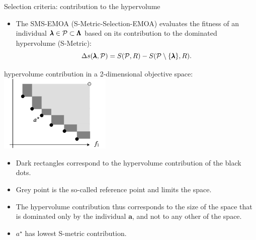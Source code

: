 \begin{frame}[allowframebreaks]{Selection criteria: contribution to the hypervolume}

\begin{itemize}
\item The SMS-EMOA (S-Metric-Selection-EMOA) evaluates the fitness of an individual $\pmb{\lambda} \in \mathcal{P} \subset \pmb{\Lambda}$ based on its contribution to the dominated hypervolume (S-Metric):
$$
\Delta s(\pmb{\lambda}, \mathcal{P}) = S(\mathcal{P}, R) - S(\mathcal{P} \setminus \{ \pmb{\lambda}\}, R).
$$
\end{itemize}



\framebreak

\begin{center}
hypervolume contribution in a 2-dimensional objective space:\\
\includegraphics[width = 0.4\textwidth]{images/hypervolumenbeitrag.png}
\end{center}

\footnotesize
\vspace*{-0.5cm}
\begin{itemize}
\item Dark rectangles correspond to the hypervolume contribution of the black dots.
\item Grey point is the so-called reference point and limits the space.
\item The hypervolume contribution thus corresponds to the size of the space that is dominated only by the individual $\bm{a}$, and not to any other of the space.
\item $a^\star$ has lowest S-metric contribution.
\end{itemize}
\end{frame}

